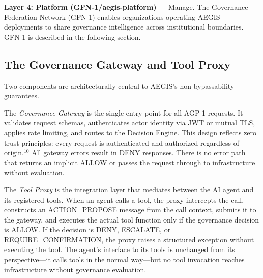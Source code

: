 \documentclass{IEEEcsmag}
\begin{document}
{\bf Layer 4: Platform (GFN-1/aegis-platform)} --- Manage. The Governance Federation Network (GFN-1) enables organizations operating AEGIS deployments to share governance intelligence across institutional boundaries. GFN-1 is described in the following section.

\subsection{The Governance Gateway and Tool Proxy}

Two components are architecturally central to AEGIS's non-bypassability guarantees.

The {\it Governance Gateway} is the single entry point for all AGP-1 requests. It validates request schemas, authenticates actor identity via JWT or mutual TLS, applies rate limiting, and routes to the Decision Engine. This design reflects zero trust principles: every request is authenticated and authorized regardless of origin.$^{10}$ All gateway errors result in DENY responses. There is no error path that returns an implicit ALLOW or passes the request through to infrastructure without evaluation.


The {\it Tool Proxy} is the integration layer that mediates between the AI agent and its registered tools. When an agent calls a tool, the proxy intercepts the call, constructs an ACTION\_PROPOSE message from the call context, submits it to the gateway, and executes the actual tool function only if the governance decision is ALLOW. If the decision is DENY, ESCALATE, or REQUIRE\_CONFIRMATION, the proxy raises a structured exception without executing the tool. The agent's interface to its tools is unchanged from its perspective---it calls tools in the normal way---but no tool invocation reaches infrastructure without governance evaluation.
\end{document}
